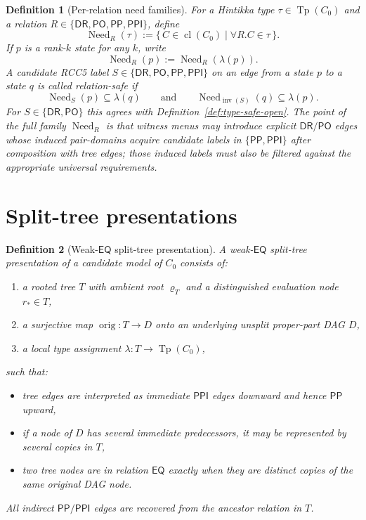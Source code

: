 \documentclass[11pt]{article}
\newtheorem{definition}{Definition}[section]
\theoremstyle{remark}
\newcommand{\DR}{\mathsf{DR}}
\newcommand{\PO}{\mathsf{PO}}
\newcommand{\PP}{\mathsf{PP}}
\newcommand{\PPI}{\mathsf{PPI}}
\newcommand{\EQ}{\mathsf{EQ}}
\newcommand{\RCC}{\{\DR,\PO,\PP,\PPI\}}
\newcommand{\cl}{\operatorname{cl}}
\newcommand{\Tp}{\operatorname{Tp}}
\newcommand{\Need}{\operatorname{Need}}
\newcommand{\inv}{\operatorname{inv}}
\newcommand{\orig}{\operatorname{orig}}
\begin{document}
\begin{definition}[Per-relation need families]\label{def:need-families}
For a Hintikka type $\tau\in\Tp(C_0)$ and a relation $R\in\RCC$, define
\[
\Need_R(\tau):=\{\,C\in \cl(C_0)\mid \forall R.C\in \tau\,\}.
\]
If $p$ is a rank-$k$ state for any $k$, write
\[
\Need_R(p):=\Need_R(\lambda(p)).
\]
A candidate RCC5 label $S\in\RCC$ on an edge from a state $p$ to a state $q$ is called \emph{relation-safe} if
\[
\Need_S(p)\subseteq \lambda(q)
\qquad\text{and}\qquad
\Need_{\inv(S)}(q)\subseteq \lambda(p).
\]
For $S\in\{\DR,\PO\}$ this agrees with Definition~\ref{def:type-safe-open}. The point of the full family $\Need_R$ is that witness menus may introduce explicit $\DR/\PO$ edges whose \emph{induced} pair-domains acquire candidate labels in $\{\PP,\PPI\}$ after composition with tree edges; those induced labels must also be filtered against the appropriate universal requirements.
\end{definition}

\section{Split-tree presentations}

\begin{definition}[Weak-$\EQ$ split-tree presentation]
A \emph{weak-$\EQ$ split-tree presentation} of a candidate model of $C_0$ consists of:
\begin{enumerate}[label=(\roman*)]
    \item a rooted tree $T$ with ambient root $\varrho_T$ and a distinguished \emph{evaluation node} $r_\ast\in T$,
    \item a surjective map $\orig:T\to D$ onto an underlying unsplit proper-part DAG $D$,
    \item a local type assignment $\lambda:T\to\Tp(C_0)$,
\end{enumerate}
such that:
\begin{itemize}
    \item tree edges are interpreted as immediate $\PPI$ edges downward and hence $\PP$ upward,
    \item if a node of $D$ has several immediate predecessors, it may be represented by several copies in $T$,
    \item two tree nodes are in relation $\EQ$ exactly when they are distinct copies of the same original DAG node.
\end{itemize}
All indirect $\PP/\PPI$ edges are recovered from the ancestor relation in $T$.
\end{definition}
\end{document}
